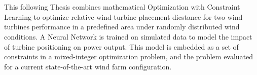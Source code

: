 \chapter{\abstractname}


This following Thesis combines mathematical Optimization with Constraint Learning to optimize relative wind turbine placement dicstance for two wind turbines performance in a predefined area under randomly distributed wind conditions. A Neural Network is trained on simulated data to model the impact of turbine positioning on power output. This model is embedded as a set of constraints in a mixed-integer optimization problem, and the problem evaluated for a current state-of-the-art wind farm configuration.

\makeatletter
{}
{\renewcommand{\abstractname}{Kurzfassung}}
{\renewcommand{\abstractname}{Abstract}}
\makeatother